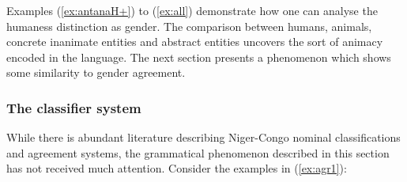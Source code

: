 Examples (\ref{ex:antanaH+}) to (\ref{ex:all}) demonstrate how one can analyse
the humaness distinction as gender. The comparison between humans, animals,
concrete inanimate entities and abstract entities uncovers the sort of animacy
encoded in the language. The next section  presents a phenomenon which
shows
some similarity to gender agreement.



\subsubsection{The classifier system}
\label{sec:classifier}

 While there is abundant  literature describing Niger-Congo nominal
classifications and
agreement systems, the grammatical phenomenon  described in
this section  has not received much attention.  Consider the examples in
(\ref{ex:agr1}):      


